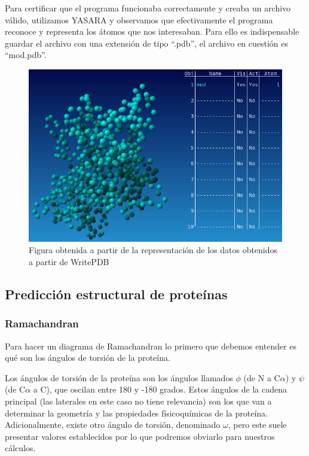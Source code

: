 \documentclass[12pt]{article}
\begin{document}
Para certificar que el programa funcionaba correctamente y creaba un archivo válido, utilizamos YASARA y observamos que efectivamente el programa reconoce y representa los átomos que nos interesaban. Para ello es indispensable guardar el archivo con una extensión de tipo ``.pdb'', el archivo en cuestión es ``mod.pdb''.
\begin{figure}[H]
\centering
\includegraphics[scale=0.51]{Screenshot_42}
\caption{ Figura obtenida a partir de la representación de los datos obtenidos a partir de WritePDB }
\end{figure}


\subsection{Predicción estructural de proteínas}
\subsubsection{Ramachandran}
Para hacer un diagrama de Ramachandran lo primero que debemos entender es qué son los ángulos de torsión de la proteína.
\newline

Los ángulos de torsión de la proteína son los ángulos llamados $\phi$ (de N a C$\alpha$)  y $\psi$ (de C$\alpha$ a C), que oscilan entre 180 y -180 grados. Estos ángulos de la cadena principal (las laterales en este caso no tiene relevancia) son los que van a determinar la geometría y las propiedades físicoquímicas de la proteína. Adicionalmente, existe otro ángulo de torsión, denominado $\omega$, pero este suele presentar valores establecidos por lo que podremos obviarlo para nuestros cálculos.
\newline
\end{document}
